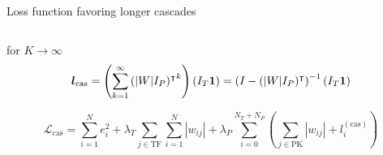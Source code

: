 \begin{frame}{Loss function favoring longer cascades}
\begin{columns}
\begin{column}{0.65\textwidth}
for $K\rightarrow\infty$
\begin{equation}
\boldsymbol{l}_{\text{cas}} =
\left(
\sum_{k=1}^\infty {(|W|I_P)^\intercal}^k
\right)
(I_T \boldsymbol{1} )
=
\left(
I-(|W|I_P)^\intercal
\right)^{-1}
(I_T \boldsymbol{1} )
\end{equation}


\begin{equation}
\mathcal{L}_\text{cas} =
\sum_{i=1}^N e_i^2 + \lambda_T \sum_{j \in \text{TF}} \sum_{i=1}^N |w_{ij}| + \lambda_P \sum_{i=0}^{N_T + N_P} \left(
\sum_{j \in \text{PK}} |w_{ij}|
+ l_i^{(\text{cas})}
\right)
\label{eq:loss_cas}
\end{equation}



\end{column}
\end{columns}
\end{frame}
